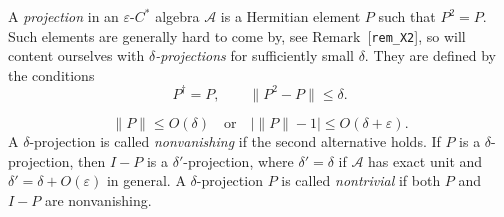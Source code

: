 \hypertarget{def:delta-projection}{}%
\begin{definition}\label{def:delta-projection}
A \emph{projection} in an $\varepsilon$-$C^*$ algebra $\mathcal{A}$ is a Hermitian element $P$ such that $P^2=P$. Such elements are generally hard to come by, see Remark~\textup{[\texttt{rem\_X2}]}, so will content ourselves with \emph{$\delta$-projections} for sufficiently small $\delta$. They are defined by the conditions
\begin{equation*}
P^\dagger=P,\qquad \|P^2-P\|\le\delta.
\end{equation*}

\begin{equation*}
\|P\|\le O(\delta)\quad \text{or}\quad \bigl|\|P\|-1\bigr|\le O(\delta+\varepsilon).
\end{equation*}
A $\delta$-projection is called \emph{nonvanishing} if the second alternative holds. If $P$ is a $\delta$-projection, then $I-P$ is a $\delta'$-projection, where $\delta'=\delta$ if $\mathcal{A}$ has exact unit and $\delta'=\delta+O(\varepsilon)$ in general. A $\delta$-projection $P$ is called \emph{nontrivial} if both $P$ and $I-P$ are nonvanishing.
\end{definition}
